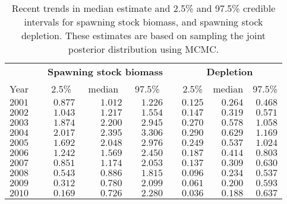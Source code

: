 %
\begin{table}[!tbp]
 \caption{Recent trends in median estimate and 2.5\% and 97.5\% 
					credible intervals for spawning stock biomass, and
					spawning stock depletion. These estimates are based 
					on sampling the joint posterior distribution using MCMC.\label{iscam.T1}} 
 \begin{center}
 \begin{tabular}{rcrrrcrrr}\hline\hline
\multicolumn{1}{c}{\bfseries  }&
\multicolumn{1}{c}{\bfseries }&
\multicolumn{3}{c}{\bfseries Spawning stock biomass}&
\multicolumn{1}{c}{\bfseries }&
\multicolumn{3}{c}{\bfseries Depletion}
\tabularnewline \cline{1-9}
\multicolumn{1}{c}{Year}&\multicolumn{1}{c}{}&\multicolumn{1}{c}{2.5\%}&\multicolumn{1}{c}{median}&\multicolumn{1}{c}{97.5\%}&\multicolumn{1}{c}{}&\multicolumn{1}{c}{2.5\%}&\multicolumn{1}{c}{median}&\multicolumn{1}{c}{97.5\%}\tabularnewline
\hline
$2001$&&$0.877$&$1.012$&$1.226$&&$0.125$&$0.264$&$0.468$\tabularnewline
$2002$&&$1.043$&$1.217$&$1.554$&&$0.147$&$0.319$&$0.571$\tabularnewline
$2003$&&$1.874$&$2.200$&$2.945$&&$0.270$&$0.578$&$1.058$\tabularnewline
$2004$&&$2.017$&$2.395$&$3.306$&&$0.290$&$0.629$&$1.169$\tabularnewline
$2005$&&$1.692$&$2.048$&$2.976$&&$0.249$&$0.537$&$1.024$\tabularnewline
$2006$&&$1.242$&$1.569$&$2.450$&&$0.187$&$0.414$&$0.803$\tabularnewline
$2007$&&$0.851$&$1.174$&$2.053$&&$0.137$&$0.309$&$0.630$\tabularnewline
$2008$&&$0.543$&$0.886$&$1.815$&&$0.096$&$0.234$&$0.537$\tabularnewline
$2009$&&$0.312$&$0.780$&$2.099$&&$0.061$&$0.200$&$0.593$\tabularnewline
$2010$&&$0.169$&$0.726$&$2.280$&&$0.036$&$0.188$&$0.637$\tabularnewline
\hline
\end{tabular}

\end{center}

\end{table}

